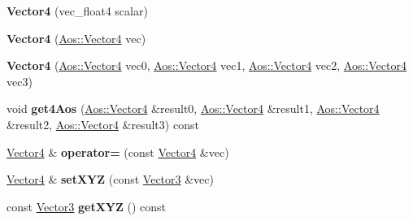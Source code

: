 \begin{DoxyCompactItemize}
\item 
\hypertarget{classVectormath_1_1Soa_1_1Vector4_a3b92a376c6943e1c98d1743a6e52c4c3}{{\bfseries Vector4} (vec\-\_\-float4 scalar)}\label{classVectormath_1_1Soa_1_1Vector4_a3b92a376c6943e1c98d1743a6e52c4c3}

\item 
\hypertarget{classVectormath_1_1Soa_1_1Vector4_a9ba12673c1971d723aa063d4b78fe498}{{\bfseries Vector4} (\hyperlink{classVectormath_1_1Aos_1_1Vector4}{Aos\-::\-Vector4} vec)}\label{classVectormath_1_1Soa_1_1Vector4_a9ba12673c1971d723aa063d4b78fe498}

\item 
\hypertarget{classVectormath_1_1Soa_1_1Vector4_a965781b287b75c1c822f82ca71e451ae}{{\bfseries Vector4} (\hyperlink{classVectormath_1_1Aos_1_1Vector4}{Aos\-::\-Vector4} vec0, \hyperlink{classVectormath_1_1Aos_1_1Vector4}{Aos\-::\-Vector4} vec1, \hyperlink{classVectormath_1_1Aos_1_1Vector4}{Aos\-::\-Vector4} vec2, \hyperlink{classVectormath_1_1Aos_1_1Vector4}{Aos\-::\-Vector4} vec3)}\label{classVectormath_1_1Soa_1_1Vector4_a965781b287b75c1c822f82ca71e451ae}

\item 
\hypertarget{classVectormath_1_1Soa_1_1Vector4_a73b9de38bd4999068db7edcc07c5d3bd}{void {\bfseries get4\-Aos} (\hyperlink{classVectormath_1_1Aos_1_1Vector4}{Aos\-::\-Vector4} \&result0, \hyperlink{classVectormath_1_1Aos_1_1Vector4}{Aos\-::\-Vector4} \&result1, \hyperlink{classVectormath_1_1Aos_1_1Vector4}{Aos\-::\-Vector4} \&result2, \hyperlink{classVectormath_1_1Aos_1_1Vector4}{Aos\-::\-Vector4} \&result3) const }\label{classVectormath_1_1Soa_1_1Vector4_a73b9de38bd4999068db7edcc07c5d3bd}

\item 
\hypertarget{classVectormath_1_1Soa_1_1Vector4_a712629f891354ddd9e5ab11aadc91e6a}{\hyperlink{classVectormath_1_1Soa_1_1Vector4}{Vector4} \& {\bfseries operator=} (const \hyperlink{classVectormath_1_1Soa_1_1Vector4}{Vector4} \&vec)}\label{classVectormath_1_1Soa_1_1Vector4_a712629f891354ddd9e5ab11aadc91e6a}

\item 
\hypertarget{classVectormath_1_1Soa_1_1Vector4_a5b4a6ec26ecc46849d84cffc4efc011f}{\hyperlink{classVectormath_1_1Soa_1_1Vector4}{Vector4} \& {\bfseries set\-X\-Y\-Z} (const \hyperlink{classVectormath_1_1Soa_1_1Vector3}{Vector3} \&vec)}\label{classVectormath_1_1Soa_1_1Vector4_a5b4a6ec26ecc46849d84cffc4efc011f}

\item 
\hypertarget{classVectormath_1_1Soa_1_1Vector4_a261289b18755e142403263b0e26bccf6}{const \hyperlink{classVectormath_1_1Soa_1_1Vector3}{Vector3} {\bfseries get\-X\-Y\-Z} () const }\label{classVectormath_1_1Soa_1_1Vector4_a261289b18755e142403263b0e26bccf6}


\end{DoxyCompactItemize}
